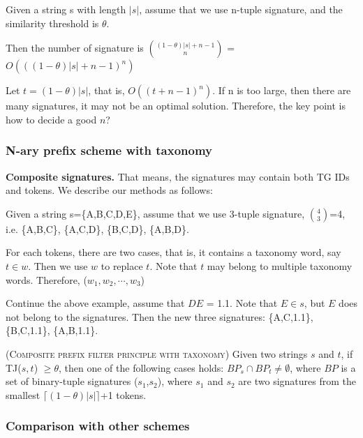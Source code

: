 Given a string s with length $|s|$, assume that we use n-tuple signature, and the similarity threshold is $\theta$.

Then the number of signature is  $\binom{(1-\theta)|s|+n-1}{n}$ = $O(((1-\theta)|s|+n-1)^{n})$

Let $t= (1-\theta)|s|$, that is, $O((t+n-1)^{n})$. If n is too large, then there are many signatures, it may not be an optimal solution. Therefore, the key point is how to decide a good $n$?

\subsubsection{N-ary prefix scheme with taxonomy}

\noindent \textbf{Composite signatures.} That means, the signatures may contain both TG IDs and tokens. We describe our methods as follows:

 Given a string s=\{A,B,C,D,E\}, assume that we use 3-tuple signature, $\binom{4}{3}$=4, i.e. \{A,B,C\}, \{A,C,D\}, \{B,C,D\}, \{A,B,D\}.

For each tokens, there are two cases, that is, it contains a taxonomy word, say $t \in w$. Then we use $w$ to replace $t$. Note that $t$ may belong to multiple taxonomy words. Therefore, ($w_1, w_2, \cdots, w_3$)

Continue the above example, assume that $DE$ = 1.1. Note that $E \in s $, but $E$ does not belong to the signatures. Then the new three signatures:  \{A,C,1.1\}, \{B,C,1.1\}, \{A,B,1.1\}.


\begin{lem} (\textsc{Composite prefix filter principle with taxonomy})  Given two strings $s$ and $t$, if TJ($s, t$) $\geq \theta$, then one of the following cases holds: $BP_s \cap BP_t \neq \emptyset$, where $BP$ is a set of binary-tuple signatures ($s_1$,$s_2$), where $s_1$ and $s_2$ are two signatures from the  smallest $\lceil(1-\theta)|s|\rceil$+1 tokens.

\end{lem}

\subsubsection{Comparison with other schemes}


